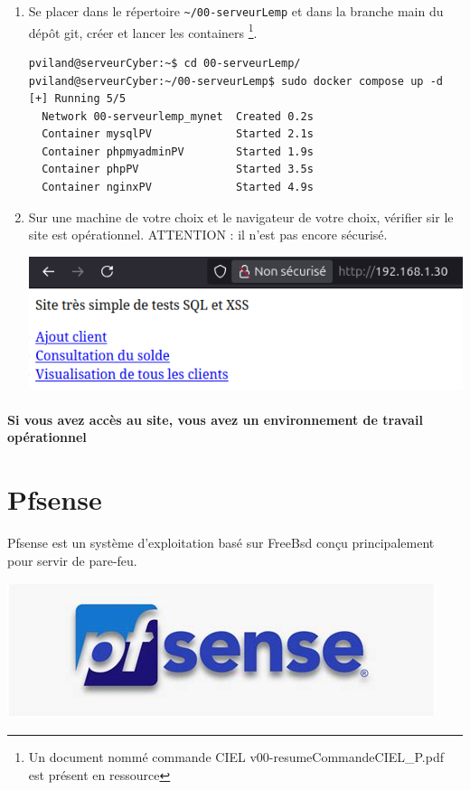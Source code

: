 \documentclass[french, 12pt]{article}%
\begin{document}
\begin{enumerate}[resume]


\item Se placer dans le répertoire \verb?~/00-serveurLemp? et dans la branche main du dépôt git, créer et lancer les containers \footnote{Un document nommé commande CIEL v00-resumeCommandeCIEL\_P.pdf est présent en ressource }. 


\begin{lstlisting}[style=commande]
pviland@serveurCyber:~$ cd 00-serveurLemp/
pviland@serveurCyber:~/00-serveurLemp$ sudo docker compose up -d
[+] Running 5/5
  Network 00-serveurlemp_mynet  Created 0.2s
  Container mysqlPV             Started 2.1s
  Container phpmyadminPV        Started 1.9s
  Container phpPV               Started 3.5s
  Container nginxPV             Started 4.9s
\end{lstlisting}

\item Sur une machine de votre choix et le navigateur de votre choix, vérifier sir le site est opérationnel. ATTENTION : il n'est pas encore sécurisé.

\begin{center}
\includegraphics[scale=0.5]{./ressource/exServeurNonsecur.png}
\end{center}

\end{enumerate}

\paragraph{Si vous avez accès au site, vous avez un environnement de travail opérationnel}

\section{Pfsense}

Pfsense est un système d'exploitation basé sur FreeBsd conçu principalement pour servir de pare-feu. 

\begin{center}
\includegraphics[scale=0.4]{./ressource/pfsenseLogo}
\end{center}
\end{document}
